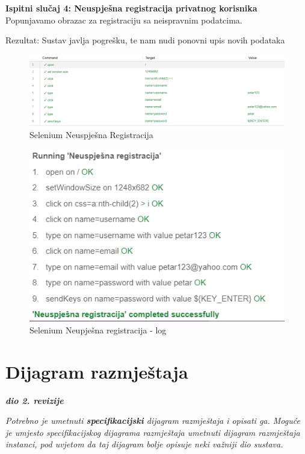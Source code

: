             \textbf{Ispitni slučaj 4: Neuspješna registracija privatnog korisnika}
    Popunjavamo obrazac za registraciju sa neispravnim podatcima.
    
    Rezultat: Sustav javlja pogrešku, te nam nudi ponovni upis novih podataka

    \begin{figure}[H]
			\includegraphics[scale=0.5]{slike/NeuspjesnaRegistracija2.png}
			\centering
			\caption{Selenium Neuspješna Registracija}
			\label{fig:promjene}
		          \end{figure}


\begin{figure}[H]
			\includegraphics[scale=0.8]{slike/NeuspjesnaRegistracija1.png}
			\centering
			\caption{Selenium Neupješna registracija - log}
			\label{fig:promjene}
		          \end{figure}
    
			
			\eject 
		
		
		\section{Dijagram razmještaja}
			
			\textbf{\textit{dio 2. revizije}}
			
			 \textit{Potrebno je umetnuti \textbf{specifikacijski} dijagram razmještaja i opisati ga. Moguće je umjesto specifikacijskog dijagrama razmještaja umetnuti dijagram razmještaja instanci, pod uvjetom da taj dijagram bolje opisuje neki važniji dio sustava.}
			

